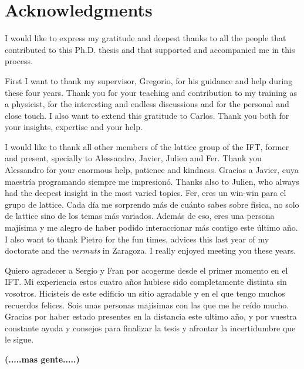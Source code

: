 
\bigskip

\begingroup
\let\clearpage\relax
\let\cleardoublepage\relax
\let\cleardoublepage\relax
\chapter*{Acknowledgments}

I would like to express my gratitude and deepest thanks to all the people that contributed to this Ph.D. thesis and that supported and accompanied me in this process.

First I want to thank my supervisor, Gregorio, for his guidance and help during these four years. Thank you for your teaching and contribution to my training as a physicist, for the interesting and endless discussions and for the personal and close touch. I also want to extend this gratitude to Carlos. Thank you both for your insights, expertise and your help.

I would like to thank all other members of the lattice group of the IFT, former and present, specially to Alessandro, Javier, Julien and Fer. Thank you Alessandro for your enormous help, patience and kindness. Gracias a Javier, cuya maestría programando siempre me impresionó. Thanks also to Julien, who always had the deepest insight in the most varied topics. Fer, eres un win-win para el grupo de lattice. Cada día me sorprendo más de cuánto sabes sobre física, no solo de lattice sino de los temas más variados. Además de eso, eres una persona majísima y me alegro de haber podido interaccionar más contigo este último año. I also want to thank Pietro for the fun times, advices this last year of my doctorate and the \textit{vermuts} in Zaragoza. I really enjoyed meeting you these years.

Quiero agradecer a Sergio y Fran por acogerme desde el primer momento en el IFT. Mi experiencia estos cuatro años hubiese sido completamente distinta sin vosotros. Hicisteis de este edificio un sitio agradable y en el que tengo muchos recuerdos felices. Sois unas personas majísimas con las que me he reído mucho. Gracias por haber estado presentes en la distancia este ultimo año, y por vuestra constante ayuda y consejos para finalizar la tesis y afrontar la incertidumbre que le sigue.

\textbf{(.....mas gente.....)}

